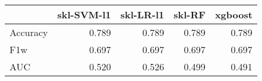 \begin{tabular}{lrrrr}
\toprule
{} &  skl-SVM-l1 &  skl-LR-l1 &  skl-RF &  xgboost \\
\midrule
Accuracy &       0.789 &      0.789 &   0.789 &    0.789 \\
F1w      &       0.697 &      0.697 &   0.697 &    0.697 \\
AUC      &       0.520 &      0.526 &   0.499 &    0.491 \\
\bottomrule
\end{tabular}
